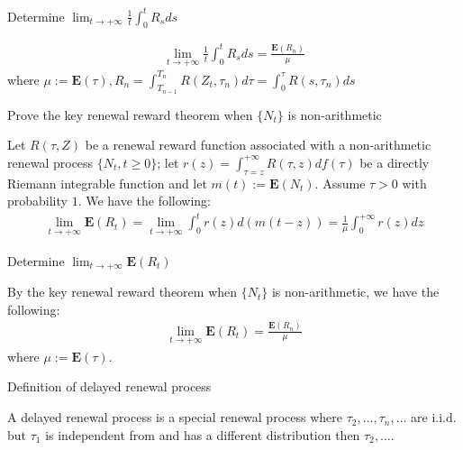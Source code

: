 \documentclass[11pt]{article}
\newcommand{\expect}[1]{\mathbf{E}(#1)}
\newcommand*{\xfield}[1]{\begin{mdframed}\centering #1\end{mdframed}\bigskip}
\newenvironment{field}{}{}
\newenvironment{note}{}{}
\begin{document}
%
\begin{note}
  \xfield{Determine \(\displaystyle \lim_{t \to +\infty} \frac{1}{t} \int_0^t R_s
    ds\)}
  \begin{field}
    \begin{align*}
      \lim_{t \to +\infty} \frac{1}{t} \int_0^t R_s ds = \frac{\expect{R_n}}{\mu}
    \end{align*}
    where \(\mu := \expect{\tau}, R_n = \displaystyle \int_{T_{n-1}}^{T_n} R(Z_t,
    \tau_n) d \tau =  \int_0^\tau R(s, \tau_n) ds\)
  \end{field}
\end{note}
%
\begin{note}
  \xfield{Prove the key renewal reward theorem when \(\{N_t\}\) is non-arithmetic}
  \begin{field}
    Let \(R(\tau, Z)\) be a renewal reward function associated with a
    non-arithmetic renewal process \(\{N_t, t \geq 0\}\); let \(r(z) =
    \int_{\tau = z}^{+\infty} R(\tau, z) d f(\tau)\) be a directly
    Riemann integrable function and let \(m(t) :=
    \expect{N_t}\). Assume \(\tau > 0\) with probability \(1\). We
    have the following:
    \begin{align*}
      \displaystyle
      \lim_{t \to +\infty} \expect{R_t} = \lim_{t \to +\infty}
      \int_0^t r(z) d( m(t-z) ) = \frac{1}{\mu} \int_0^{+\infty} r(z) dz
    \end{align*}
  \end{field}

\end{note}
%
\begin{note}
  \xfield{Determine \(\displaystyle \lim_{t \to +\infty}
    \expect{R_t}\)}
  \begin{field}
    By the key renewal reward theorem when \(\{N_t\}\) is
    non-arithmetic, we have the following:
    \begin{align*}
      \displaystyle
      \lim_{t \to +\infty} \expect{R_t} = \frac{\expect{R_n}}{\mu}
    \end{align*}
    where \(\mu := \expect{\tau}\).
  \end{field}
\end{note}
%
\begin{note}
  \xfield{Definition of delayed renewal process}
  \begin{field}
    A delayed renewal process is a special renewal process where
    \(\tau_2, \ldots, \tau_n, \ldots\) are i.i.d. but \(\tau_1\) is
    independent from and has a different distribution then \(\tau_2,
    \ldots\).
  \end{field}
\end{note}
\end{document}
